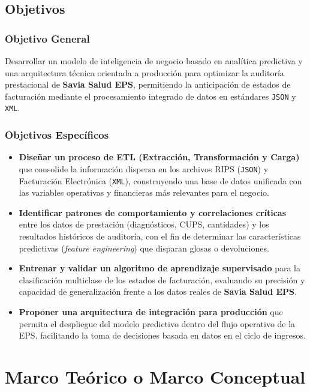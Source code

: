\documentclass[12pt,letterpaper]{report}
\begin{document}
\section{Objetivos}

\subsection{Objetivo General}
Desarrollar un modelo de inteligencia de negocio basado en analítica predictiva y una arquitectura técnica orientada a producción para optimizar la auditoría prestacional de \textbf{Savia Salud EPS}, permitiendo la anticipación de estados de facturación mediante el procesamiento integrado de datos en estándares \texttt{JSON} y \texttt{XML}.

\subsection{Objetivos Específicos}
\begin{itemize}
    \item \textbf{Diseñar un proceso de ETL (Extracción, Transformación y Carga)} que consolide la información dispersa en los archivos RIPS (\texttt{JSON}) y Facturación Electrónica (\texttt{XML}), construyendo una base de datos unificada con las variables operativas y financieras más relevantes para el negocio.
    \item \textbf{Identificar patrones de comportamiento y correlaciones críticas} entre los datos de prestación (diagnósticos, CUPS, cantidades) y los resultados históricos de auditoría, con el fin de determinar las características predictivas (\textit{feature engineering}) que disparan glosas o devoluciones.
    \item \textbf{Entrenar y validar un algoritmo de aprendizaje supervisado} para la clasificación multiclase de los estados de facturación, evaluando su precisión y capacidad de generalización frente a los datos reales de \textbf{Savia Salud EPS}.
    \item \textbf{Proponer una arquitectura de integración para producción} que permita el despliegue del modelo predictivo dentro del flujo operativo de la EPS, facilitando la toma de decisiones basada en datos en el ciclo de ingresos.
\end{itemize}

\clearpage
\chapter{Marco Teórico o Marco Conceptual} 
\end{document}
